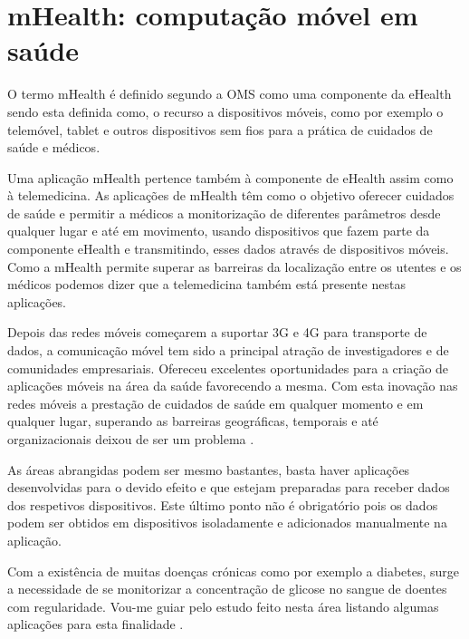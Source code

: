\section{mHealth: computação móvel em saúde}
O termo \gls{mHealth} \'e definido segundo a OMS como uma componente da eHealth \cite{mhealth_oms} sendo esta definida como, o recurso a dispositivos m\'oveis, como por exemplo o telem\'ovel, tablet e outros dispositivos sem fios para a pr\'atica de cuidados de sa\'ude e m\'edicos.
\par
Uma aplica\c c\~ao mHealth pertence tamb\'em \`a componente de eHealth assim como \`a telemedicina. As aplica\c c\~oes de mHealth t\^em como o objetivo oferecer cuidados de sa\'ude e permitir a m\'edicos a monitoriza\c c\~ao de diferentes par\^ametros desde qualquer lugar e at\'e em movimento, usando dispositivos que fazem parte da componente eHealth e transmitindo, esses dados atrav\'es de dispositivos m\'oveis. Como a mHealth permite superar as barreiras da localiza\c c\~ao entre os utentes e os m\'edicos podemos dizer que a telemedicina tamb\'em est\'a presente nestas aplica\c c\~oes.
\par
Depois das redes m\'oveis come\c carem a suportar 3G e 4G para transporte de dados, a comunica\c c\~ao m\'ovel tem sido a  principal atra\c c\~ao de investigadores e de comunidades empresariais. Ofereceu excelentes oportunidades para a cria\c c\~ao de  aplica\c c\~oes m\'oveis na \'area da sa\'ude favorecendo a mesma. Com esta inova\c c\~ao nas redes m\'oveis a presta\c c\~ao de cuidados de sa\'ude em qualquer momento e em qualquer lugar, superando as barreiras geogr\'aficas, temporais e at\'e organizacionais deixou de ser um problema \cite{mhealth}.
\par
As \'areas abrangidas podem ser mesmo bastantes, basta haver aplica\c c\~oes desenvolvidas para o devido efeito e que estejam preparadas para receber dados dos respetivos dispositivos. Este \'ultimo ponto não \'e obrigat\'orio pois os dados podem ser obtidos em dispositivos isoladamente e adicionados manualmente na aplica\c c\~ao. 
\par
Com a exist\^encia de muitas doen\c cas cr\'onicas como por exemplo a diabetes, surge a necessidade de se monitorizar a concentra\c c\~ao de glicose no sangue de doentes com regularidade. Vou-me guiar pelo estudo feito nesta \'area listando algumas aplica\c c\~oes para esta finalidade \cite{mhealth}.

